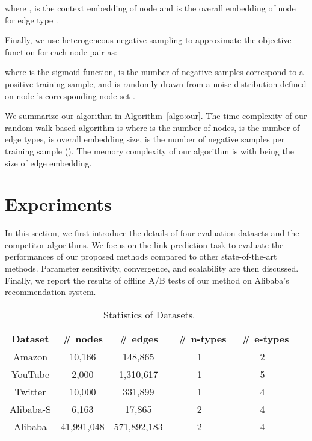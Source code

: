 \documentclass[sigconf]{acmart}
\newcommand{\company}{Alibaba}
\begin{document}
\noindent where ,  is the context embedding of node  and  is the overall embedding of node  for edge type .





Finally, we use heterogeneous negative sampling to approximate the objective function  for each node pair  as:


\noindent where  is the sigmoid function,  is the number of negative samples correspond to a positive training sample, and  is randomly drawn from a noise distribution  defined on node 's corresponding node set . 



We summarize our algorithm in Algorithm~\ref{algo:our}. The time complexity of our random walk based algorithm is  where  is the number of nodes,  is the number of edge types,  is overall embedding size,  is the number of negative samples per training sample (). The memory complexity of our algorithm is  with  being the size of edge embedding. 

 
 
\section{Experiments}\label{sec:exp}


In this section, we first introduce the details of four evaluation datasets and the competitor algorithms. We focus on the link prediction task to evaluate the performances of our proposed methods compared to other state-of-the-art methods. Parameter sensitivity, convergence, and scalability are then discussed. Finally, we report the results of offline A/B tests of our method on \company's recommendation system. 

 

\begin{table}
  \centering
  \caption{\label{tab:stats} Statistics of Datasets.}
\begin{tabular}{c|c|c|c|c}
    \hline \hline
    \textbf{Dataset} & \# nodes & \# edges & \ \# n-types & \ \# e-types \\
    \hline
    Amazon & 10,166 & 148,865 & 1 & 2 \\
YouTube & 2,000 & 1,310,617 & 1 & 5\\
Twitter & 10,000 & 331,899 & 1 & 4\\
\company-S & 6,163 & 17,865 & 2 & 4\\ \company & 41,991,048 & 571,892,183 & 2 & 4\\
    \hline \hline
  \end{tabular}
\end{table}
\end{document}
